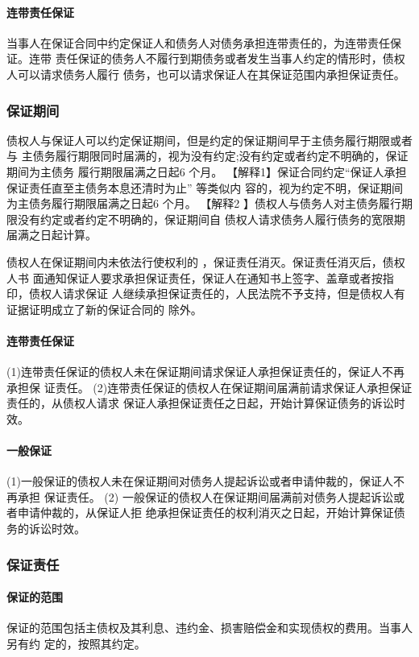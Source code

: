 \documentclass[UTF8,12pt]{ctexart}
\numberwithin{equation}{section} %
\numberwithin{figure}{section}
\numberwithin{table}{section}
\begin{document}
	\paragraph{连带责任保证} 当事人在保证合同中约定保证人和债务人对债务承担连带责任的，为连带责任保证。连带 责任保证的债务人不履行到期债务或者发生当事人约定的情形时，债权人可以请求债务人履行 债务，也可以请求保证人在其保证范围内承担保证责任。
	
	\subsubsection{保证期间}
	债权人与保证人可以约定保证期间，但是约定的保证期间早于主债务履行期限或者与 主债务履行期限同时届满的，视为没有约定;没有约定或者约定不明确的，保证期间为主债务 履行期限届满之日起6 个月。 
	【解释1】保证合同约定“保证人承担保证责任直至主债务本息还清时为止” 等类似内 容的，视为约定不明，保证期间为主债务履行期限届满之日起6 个月。
	【解释2 】债权人与债务人对主债务履行期限没有约定或者约定不明确的，保证期间自 债权人请求债务人履行债务的宽限期届满之日起计算。
	
	债权人在保证期间内未依法行使权利的 ，保证责任消灭。保证责任消灭后，债权人书 面通知保证人要求承担保证责任，保证人在通知书上签字、盖章或者按指印，债权人请求保证 人继续承担保证责任的，人民法院不予支持，但是债权人有证据证明成立了新的保证合同的 除外。
	
	\paragraph{连带责任保证} (1)连带责任保证的债权人未在保证期间请求保证人承担保证责任的，保证人不再承担保 证责任。 (2)连带责任保证的债权人在保证期间届满前请求保证人承担保证责任的，从债权人请求 保证人承担保证责任之日起，开始计算保证债务的诉讼时效。
	
	\paragraph{一般保证} (1)一般保证的债权人未在保证期间对债务人提起诉讼或者申请仲裁的，保证人不再承担 保证责任。
	(2) 一般保证的债权人在保证期间届满前对债务人提起诉讼或者申请仲裁的，从保证人拒 绝承担保证责任的权利消灭之日起，开始计算保证债务的诉讼时效。
	
	
	\subsubsection{保证责任}
	\paragraph{保证的范围} 保证的范围包括主债权及其利息、违约金、损害赔偿金和实现债权的费用。当事人另有约 定的，按照其约定。
	
\end{document}
